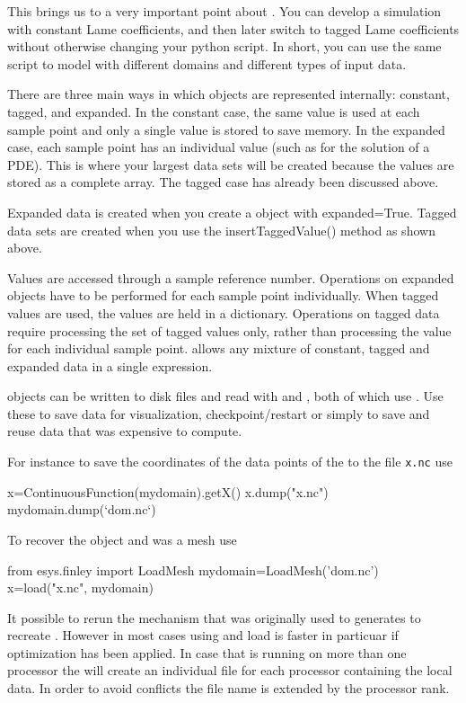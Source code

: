 This brings us to a very important point about \escript.
You can develop a simulation with constant Lame coefficients, and then later switch to tagged
Lame coefficients without otherwise changing your python script.
In short, you can use the same script to model with different domains and different types of input data.

There are three main ways in which \Data objects are represented internally: constant, tagged, and expanded.
In the constant case, the same value is used at each sample point and only a single value is stored to save memory. 
In the expanded case, each sample point has an individual value (such as for the solution of a PDE).
This is where your largest data sets will be created because the values are stored as a complete array.
The tagged case has already been discussed above.

Expanded data is created when you create a \Data object with expanded=True.
Tagged data sets are created when you use the insertTaggedValue() method as shown above.
 
Values are accessed through a sample reference number. Operations on expanded \Data
objects have to be performed for each sample point individually. When tagged values are used, the values are
held in a dictionary. Operations on tagged data require processing the set of tagged values only, rather than 
processing the value for each individual sample point. 
\escript allows any mixture of constant, tagged and expanded data in a single expression.

\Data objects can be written to disk files and read with  and , both of which use \netCDF\cite{NETCDF}.
Use these to save data for visualization, checkpoint/restart or simply to save and reuse data that was expensive to compute.

For instance to save the coordinates of the data points of the
\ContinuousFunction to the file {\tt x.nc} use 
\begin{python}
  x=ContinuousFunction(mydomain).getX()
  x.dump("x.nc")
  mydomain.dump(`dom.nc`)
\end{python}
To recover the object  and  was a \finley mesh use
\begin{python}
  from esys.finley import LoadMesh
  mydomain=LoadMesh('dom.nc')
  x=load("x.nc", mydomain)
\end{python}
It possible to rerun the mechanism that was originally used to generates
 to recreate . However in most cases using  and
load is faster in particuar if optimization has been applied. In case that
\escript is running on more than one \MPI processor the  will create an individual file for each processor containing the local data. In order to avoid conflicts the file name is extended by the \MPI processor rank.

